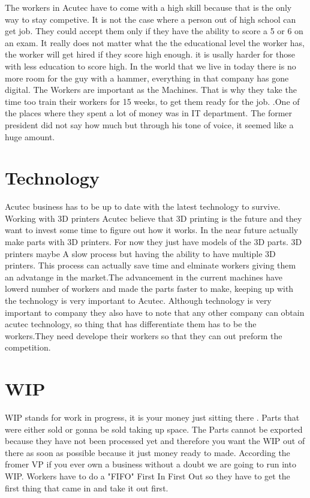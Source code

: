 \documentclass[12pt]{article}
\begin{document}
The workers in Acutec have to come with a high skill because that is the only way to stay competive. It is not the case where a person out of high school can get job. They could accept them only if they have the ability to score a 5 or 6 on an exam. 
It really does not matter what the the educational level the worker has, the worker will get hired if they score high enough. it is usally harder for those with less education to score high. In the world that we live in today there is no more room for the guy with a hammer, everything in that company has gone digital. The Workers are important as the Machines. That is why they take the time too train their workers for 15 weeks, to get them ready for the job.
.One of the places where they spent a lot of money was in IT department. The former president did not say how much but through his tone of voice, it seemed like a huge amount.  

\section{Technology}

Acutec business has to be up to date with the latest technology to survive. Working with 3D printers Acutec believe that 3D printing is the future and they want to invest some time to figure out how it works. In the near future actually make parts with 3D printers. For now they just have models of the 3D parts. 3D printers maybe A slow process but having the ability to have multiple 3D printers. This process can actually save time and elminate workers giving them an advatange in the market.The advancement in the current machines have lowerd number of workers and made the parts faster to make, keeping up with the technology is very important to Acutec. Although technology is very important to company they also have to note that any other company can obtain acutec technology, so thing that has differentiate them has to be the workers.They need develope their workers so that they can out preform the competition. 

\section{WIP}

WIP stands for work in progress, it is your money just sitting there . Parts that were either sold or gonna be sold taking up space. The Parts cannot be exported because they have not been processed yet and therefore you want the WIP out of there as soon as possible because it just money ready to made. According the fromer VP if you ever own a business without a doubt we are going to run into WIP. Workers have to do a "FIFO" First In First Out so they have to get the first thing that came in and take it out first.   
\end{document}
